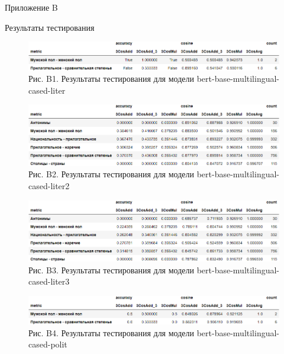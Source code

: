 \documentclass[a4paper,14pt]{article}
\begin{document}
\newpage


\begin{flushright}
	Приложение B
\end{flushright}

\begin{center}
	 Результаты тестирования
\end{center}



\begin{figure}[H]
	\centering
	\includegraphics[width=0.9\linewidth]{image/res_bert-base-multilingual-cased-liter }
	\caption*{Рис. B1. Результаты тестирования для модели bert-base-multilingual-cased-liter }
	\label{fig:resbert-base-multilingual-cased-liter }
\end{figure}

\begin{figure}[H]
	\centering
	\includegraphics[width=0.9\linewidth]{image/res_bert-base-multilingual-cased-liter2 }
	\caption*{Рис. B2. Результаты тестирования для модели bert-base-multilingual-cased-liter2 }
	\label{fig:resbert-base-multilingual-cased-liter2 }
\end{figure}

\begin{figure}[H]
	\centering
	\includegraphics[width=0.9\linewidth]{image/res_bert-base-multilingual-cased-liter3 }
	\caption*{Рис. B3. Результаты тестирования для модели bert-base-multilingual-cased-liter3 }
	\label{fig:resbert-base-multilingual-cased-liter3 }
\end{figure}

\begin{figure}[H]
	\centering
	\includegraphics[width=0.9\linewidth]{image/res_bert-base-multilingual-cased-polit }
	\caption*{Рис. B4. Результаты тестирования для модели bert-base-multilingual-cased-polit }
	\label{fig:resbert-base-multilingual-cased-polit }
\end{figure}
\end{document}
